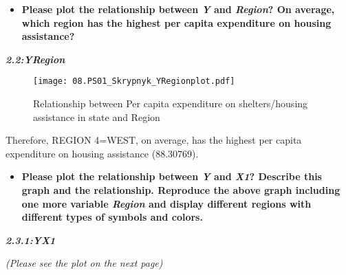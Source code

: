 \documentclass[12pt,letterpaper]{article}
\begin{document}
	\vspace{5cm}

\begin{itemize}
\item
\begin{flushleft}
	\textbf {Please plot the relationship between \emph{Y} and \emph{Region}? On average, which region has the highest per capita expenditure on housing assistance?}
\end{flushleft}
\vspace{.5cm}
\end{itemize}

\noindent \begin{center}
	\textbf {\textit{2.2:YRegion}}
\end{center}

\begin{figure}[H]
	\centering
	\caption{\footnotesize Relationship between Per capita expenditure on shelters/housing assistance in state and Region}
	\label{fig:plot_8}
	\texttt{[image: 08.PS01\_Skrypnyk\_YRegionplot.pdf]}
\end{figure}

  


	\noindent \begin{flushleft}
		Therefore, REGION 4=WEST, on average, has the highest per capita expenditure on housing assistance (88.30769).
	\end{flushleft}
	\vspace{0.5cm}
	

\begin{itemize}
\item
\begin{flushleft} \textbf 
	{Please plot the relationship between \emph{Y} and \emph{X1}? Describe this graph and the relationship. Reproduce the above graph including one more variable \emph{Region} and display different regions with different types of symbols and colors.}
\end{flushleft}
\end{itemize}

\noindent \begin{center}
	\textbf {\textit{2.3.1:YX1}}
\end{center}

\noindent \begin{center}
	\textit{(Please see the plot on the next page)}
\end{center}
\end{document}
